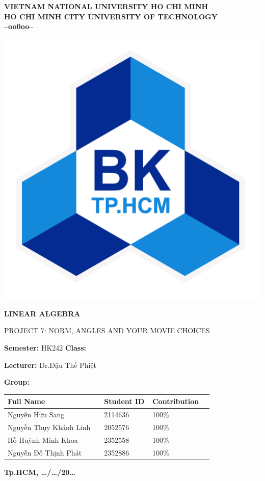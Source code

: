 \BgThispage
{}
\fontsize{13}{14}\selectfont

\begin{center}
	\Large\textbf{VIETNAM NATIONAL UNIVERSITY HO CHI MINH \\ HO CHI MINH CITY UNIVERSITY OF TECHNOLOGY\\--oo0oo--}
\end{center}

\vspace{0.5cm}
\begin{center}
	\includegraphics[width=0.3\linewidth]{sections/pic/01_logobachkhoatoi.png}
\end{center}
\vspace{0.4cm}
\begin{center}
	\LARGE\textbf{LINEAR ALGEBRA}
	\vspace{0.1cm}
	
	\Large{PROJECT 7: NORM, ANGLES AND YOUR MOVIE CHOICES  }
\end{center}
\vspace{1cm}

\Large

\textbf{Semester: } HK242 \hspace{4cm} \textbf{Class:} 

\textbf{Lecturer:} Dr.Đậu Thế Phiệt

\textbf{Group:} 

\begin{tabular}{| p{0.4\linewidth} | p{0.2\linewidth} | p{0.2\linewidth} |}
	\hline
	Full Name & Student ID & Contribution \\
	\hline
	Nguyễn Hữu Sang & 2114636 & 100\% \\
	\hline
	Nguyễn Thụy Khánh Linh	& 2052576 & 100\% \\
	\hline
	Hồ Huỳnh Minh Khoa	& 2352558 & 100\% \\
	\hline
	Nguyễn Đỗ Thịnh Phát & 2352886	 & 100\% \\
	\hline
\end{tabular}

\vspace{2cm}
\begin{center}
	\fontsize{8pt}{5pt}\selectfont\textbf{Tp.HCM, \dots/\dots/20\dots}
\end{center}

\newpage
{}
\fontsize{13}{14}\selectfont
\tableofcontents
